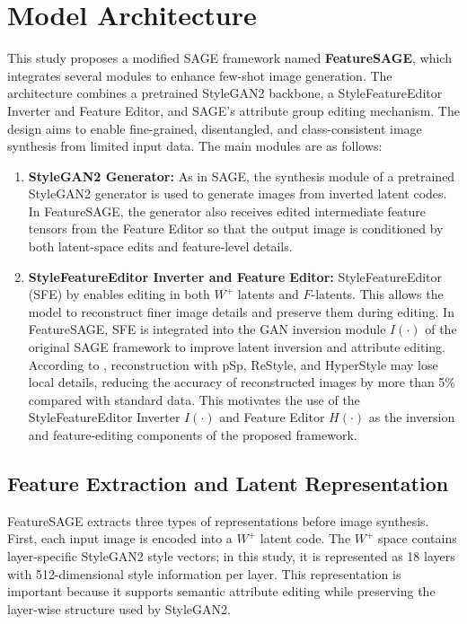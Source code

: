 \section{Model Architecture}

This study proposes a modified SAGE framework named \textbf{FeatureSAGE}, which integrates several modules to enhance few-shot image generation. The architecture combines a pretrained StyleGAN2 backbone, a StyleFeatureEditor Inverter and Feature Editor, and SAGE's attribute group editing mechanism. The design aims to enable fine-grained, disentangled, and class-consistent image synthesis from limited input data. The main modules are as follows:

\begin{enumerate}
    \item \textbf{StyleGAN2 Generator:} As in SAGE, the synthesis module of a pretrained StyleGAN2 generator is used to generate images from inverted latent codes. In FeatureSAGE, the generator also receives edited intermediate feature tensors from the Feature Editor so that the output image is conditioned by both latent-space edits and feature-level details.

    \item \textbf{StyleFeatureEditor Inverter and Feature Editor:} StyleFeatureEditor (SFE) by \citet{bobkov2024devildetailsstylefeatureeditordetailrich} enables editing in both $W^{+}$ latents and $F$-latents. This allows the model to reconstruct finer image details and preserve them during editing. In FeatureSAGE, SFE is integrated into the GAN inversion module $I(\cdot)$ of the original SAGE framework to improve latent inversion and attribute editing. According to \citet{ding2023stableattributegroupediting}, reconstruction with pSp, ReStyle, and HyperStyle may lose local details, reducing the accuracy of reconstructed images by more than 5\% compared with standard data. This motivates the use of the StyleFeatureEditor Inverter $I(\cdot)$ and Feature Editor $H(\cdot)$ as the inversion and feature-editing components of the proposed framework.
\end{enumerate}

\subsection{Feature Extraction and Latent Representation}
\label{sec:feature_extraction_latent}

FeatureSAGE extracts three types of representations before image synthesis. First, each input image is encoded into a $W^{+}$ latent code. The $W^{+}$ space contains layer-specific StyleGAN2 style vectors; in this study, it is represented as 18 layers with 512-dimensional style information per layer. This representation is important because it supports semantic attribute editing while preserving the layer-wise structure used by StyleGAN2.

